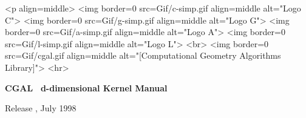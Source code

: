 
\pagestyle{empty}

\begin{titlepage}
\mbox{}
\vskip3cm

\ccTexHtml
{\centerline{
    }}
 {<p align=middle>
   <img border=0 src=Gif/c-simp.gif align=middle alt="Logo C">
   <img border=0 src=Gif/g-simp.gif align=middle alt="Logo G">
   <img border=0 src=Gif/a-simp.gif align=middle alt="Logo A">
   <img border=0 src=Gif/l-simp.gif align=middle alt="Logo L">
   <br>
   <img border=0 src=Gif/cgal.gif align=middle
    alt="[Computational Geometry Algorithms Library]">
    <hr>}

\vskip2cm
\centerline{ {\Huge\bf CGAL\ } {\huge\bf  d-dimensional Kernel Manual } }

\vskip2cm
\newcommand{\mydate}{July 1998}
\ccTexHtml
{\renewcommand{\mydate}{\ifcase\the\month \or January\or
    February\or March\or April\or May\or June\or July\or August\or
    September\or October\or November\or December\fi~\the\year}}{}
  \centerline{ {\large Release \cgalrelease, \mydate} }

\end{titlepage}




